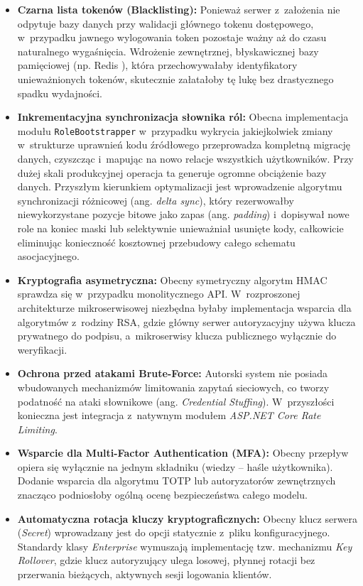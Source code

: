 \documentclass{SGGW-thesis}
\begin{document}
\begin{itemize}
    \item \textbf{Czarna lista tokenów (Blacklisting):} Ponieważ serwer z~założenia nie odpytuje bazy danych przy walidacji głównego tokenu dostępowego, w~przypadku jawnego wylogowania token pozostaje ważny aż do czasu naturalnego wygaśnięcia. Wdrożenie zewnętrznej, błyskawicznej bazy pamięciowej (np. Redis \cite{redis}), która przechowywałaby identyfikatory unieważnionych tokenów, skutecznie załatałoby tę lukę bez drastycznego spadku wydajności.
    
    \item \textbf{Inkrementacyjna synchronizacja słownika ról:} Obecna implementacja modułu \texttt{RoleBootstrapper} w~przypadku wykrycia jakiejkolwiek zmiany w~strukturze uprawnień kodu źródłowego przeprowadza kompletną migrację danych, czyszcząc i~mapując na nowo relacje wszystkich użytkowników. Przy dużej skali produkcyjnej operacja ta generuje ogromne obciążenie bazy danych. Przyszłym kierunkiem optymalizacji jest wprowadzenie algorytmu synchronizacji różnicowej (ang. \textit{delta sync}), który rezerwowałby niewykorzystane pozycje bitowe jako zapas (ang. \textit{padding}) i~dopisywał nowe role na koniec maski lub selektywnie unieważniał usunięte kody, całkowicie eliminując konieczność kosztownej przebudowy całego schematu asocjacyjnego.
    \clearpage
    \item \textbf{Kryptografia asymetryczna:} Obecny symetryczny algorytm HMAC \cite{rfc2104} sprawdza się w~przypadku monolitycznego API. W~rozproszonej architekturze mikroserwisowej \cite{fowler2002} niezbędna byłaby implementacja wsparcia dla algorytmów z~rodziny RSA, gdzie główny serwer autoryzacyjny używa klucza prywatnego do podpisu, a~mikroserwisy klucza publicznego wyłącznie do weryfikacji.
    
    \item \textbf{Ochrona przed atakami Brute-Force:} Autorski system nie posiada wbudowanych mechanizmów limitowania zapytań sieciowych, co tworzy podatność na ataki słownikowe (ang. \textit{Credential Stuffing}). W~przyszłości konieczna jest integracja z~natywnym modułem \textit{ASP.NET Core Rate Limiting}.
    
    \item \textbf{Wsparcie dla Multi-Factor Authentication (MFA):} Obecny przepływ opiera się wyłącznie na jednym składniku (wiedzy – haśle użytkownika). Dodanie wsparcia dla algorytmu TOTP \cite{ms_sec} lub autoryzatorów zewnętrznych znacząco podniosłoby ogólną ocenę bezpieczeństwa całego modelu.
    
    \item \textbf{Automatyczna rotacja kluczy kryptograficznych:} Obecny klucz serwera (\textit{Secret}) wprowadzany jest do opcji statycznie z~pliku konfiguracyjnego. Standardy klasy \textit{Enterprise} wymuszają implementację tzw. mechanizmu \textit{Key Rollover}, gdzie klucz autoryzujący ulega losowej, płynnej rotacji bez przerwania bieżących, aktywnych sesji logowania klientów.
\end{itemize}
\end{document}
